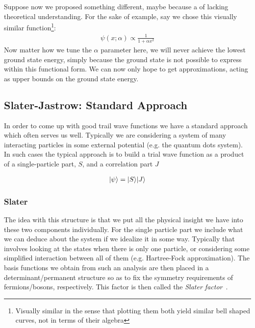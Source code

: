 \documentclass[Thesis.tex]{subfiles}
\begin{document}
Suppose now we proposed something different, maybe because a of lacking theoretical
understanding. For the sake of example, say we chose this visually similar
function\footnote{Visually similar in the sense that plotting them both yield similar bell
shaped curves, not in terms of their algebra}:
\begin{align}
    \psi(x; \alpha)\propto \frac{1}{1 + \alpha x^2}
\end{align}
Now matter how we tune the $\alpha$ parameter here, we will never achieve the lowest
ground state energy, simply because the ground state is not possible to express within this
functional form. We can now only hope to get approximations, acting as upper bounds on the
ground state energy.

\subsection{Slater-Jastrow: Standard Approach}
\label{sec:slater-jastrow}

In order to come up with good trail wave functions we have a standard approach which often
serves us well. Typically we are considering a system of many interacting particles in
some external potential (e.g. the quantum dots system). In such cases the typical approach
is to build a trial wave function as a product of a single-particle part, $S$, and a correlation
part $J$

\begin{align}
    | \psi \rangle = | S \rangle | J \rangle
\end{align}

\subsubsection*{Slater}

The idea with this structure is that we put all the physical insight we have into these
two components individually. For the single particle part we include what we can deduce
about the system if we idealize it in some way. Typically that involves looking at the
states when there is only one particle, or considering some simplified interaction between
all of them (e.g. Hartree-Fock approximation). The basis functions we obtain from such an
analysis are then placed in a determinant/permanent structure so as to fix the symmetry
requirements of fermions/bosons, respectively. This factor is then called the \emph{Slater
factor}~\cite{Slater-1929,Dirac-1926}.
\end{document}
